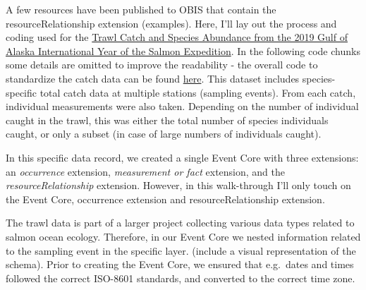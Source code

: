 \documentclass[
]{book}
\begin{document}
A few resources have been published to OBIS that contain the resourceRelationship extension (examples). Here, I'll lay out the process and coding used for the \href{http://ipt.iobis.org/obiscanada/resource?r=trawl-catch-and-species-abundance-from-the-2019-gulf-of-alaska-international-year-of-the-salmon-expedition}{Trawl Catch and Species Abundance from the 2019 Gulf of Alaska International Year of the Salmon Expedition}. In the following code chunks some details are omitted to improve the readability - the overall code to standardize the catch data can be found \href{https://github.com/HakaiInstitute/iys-oos/blob/develop/datasets/GoA_2019/Trawl/2019/data_wrangle_trawl2019.Rmd}{here}. This dataset includes species-specific total catch data at multiple stations (sampling events). From each catch, individual measurements were also taken. Depending on the number of individual caught in the trawl, this was either the total number of species individuals caught, or only a subset (in case of large numbers of individuals caught).

In this specific data record, we created a single Event Core with three extensions: an \emph{occurrence} extension, \emph{measurement or fact} extension, and the \emph{resourceRelationship} extension. However, in this walk-through I'll only touch on the Event Core, occurrence extension and resourceRelationship extension.

The trawl data is part of a larger project collecting various data types related to salmon ocean ecology. Therefore, in our Event Core we nested information related to the sampling event in the specific layer. (include a visual representation of the schema). Prior to creating the Event Core, we ensured that e.g.~dates and times followed the correct ISO-8601 standards, and converted to the correct time zone.
\end{document}
